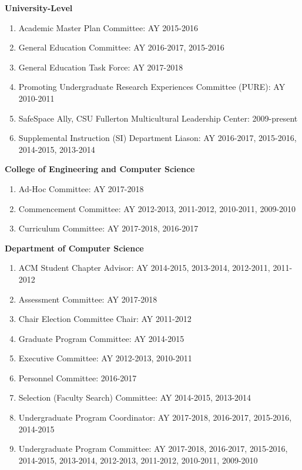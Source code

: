\documentclass[11pt]{letter}
\begin{document}

\textbf{University-Level}
\begin{enumerate}
\item Academic Master Plan Committee: AY 2015-2016
\item General Education Committee: AY 2016-2017, 2015-2016
\item General Education Task Force: AY 2017-2018
\item Promoting Undergraduate Research Experiences Committee (PURE): AY 2010-2011
\item SafeSpace Ally, CSU Fullerton Multicultural Leadership Center: 2009-present
\item Supplemental Instruction (SI) Department Liason: AY 2016-2017, 2015-2016, 2014-2015, 2013-2014
\end{enumerate}

\textbf{College of Engineering and Computer Science}
\begin{enumerate}
\item Ad-Hoc Committee: AY 2017-2018
\item Commencement Committee: AY 2012-2013, 2011-2012, 2010-2011, 2009-2010
\item Curriculum Committee: AY 2017-2018, 2016-2017
\end{enumerate}

\textbf{Department of Computer Science}
\begin{enumerate}
\item ACM Student Chapter Advisor: AY 2014-2015, 2013-2014, 2012-2011, 2011-2012
\item Assessment Committee: AY 2017-2018
\item Chair Election Committee Chair: AY 2011-2012
\item Graduate Program Committee: AY 2014-2015
\item Executive Committee: AY 2012-2013, 2010-2011
\item Personnel Committee: 2016-2017
\item Selection (Faculty Search) Committee: AY 2014-2015, 2013-2014
\item Undergraduate Program Coordinator: AY 2017-2018, 2016-2017, 2015-2016, 2014-2015
\item Undergraduate Program Committee: AY 2017-2018, 2016-2017, 2015-2016, 2014-2015, 2013-2014, 2012-2013, 2011-2012, 2010-2011, 2009-2010
\end{enumerate}
\end{document}
